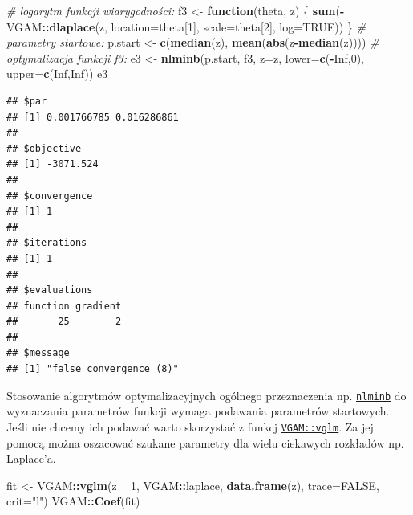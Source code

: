\documentclass[polish,]{book}
\newenvironment{Shaded}{\begin{snugshade}}{\end{snugshade}}
\newcommand{\CommentTok}[1]{\textcolor[rgb]{0.56,0.35,0.01}{\textit{#1}}}
\newcommand{\ControlFlowTok}[1]{\textcolor[rgb]{0.13,0.29,0.53}{\textbf{#1}}}
\newcommand{\DataTypeTok}[1]{\textcolor[rgb]{0.13,0.29,0.53}{#1}}
\newcommand{\DecValTok}[1]{\textcolor[rgb]{0.00,0.00,0.81}{#1}}
\newcommand{\KeywordTok}[1]{\textcolor[rgb]{0.13,0.29,0.53}{\textbf{#1}}}
\newcommand{\NormalTok}[1]{#1}
\newcommand{\OperatorTok}[1]{\textcolor[rgb]{0.81,0.36,0.00}{\textbf{#1}}}
\newcommand{\OtherTok}[1]{\textcolor[rgb]{0.56,0.35,0.01}{#1}}
\newcommand{\StringTok}[1]{\textcolor[rgb]{0.31,0.60,0.02}{#1}}
\begin{document}
\begin{Shaded}
\begin{Highlighting}[]
\CommentTok{# logarytm funkcji wiarygodności:}
\NormalTok{f3 <-}\StringTok{ }\ControlFlowTok{function}\NormalTok{(theta, z) \{}
  \KeywordTok{sum}\NormalTok{(}\OperatorTok{-}\NormalTok{VGAM}\OperatorTok{::}\KeywordTok{dlaplace}\NormalTok{(z, }\DataTypeTok{location=}\NormalTok{theta[}\DecValTok{1}\NormalTok{], }\DataTypeTok{scale=}\NormalTok{theta[}\DecValTok{2}\NormalTok{], }\DataTypeTok{log=}\OtherTok{TRUE}\NormalTok{))}
\NormalTok{  \}}
\CommentTok{# parametry startowe:}
\NormalTok{p.start <-}\StringTok{ }\KeywordTok{c}\NormalTok{(}\KeywordTok{median}\NormalTok{(z), }\KeywordTok{mean}\NormalTok{(}\KeywordTok{abs}\NormalTok{(z}\OperatorTok{-}\KeywordTok{median}\NormalTok{(z))))}
\CommentTok{# optymalizacja funkcji f3:}
\NormalTok{e3 <-}\StringTok{ }\KeywordTok{nlminb}\NormalTok{(p.start, f3, }\DataTypeTok{z=}\NormalTok{z, }\DataTypeTok{lower=}\KeywordTok{c}\NormalTok{(}\OperatorTok{-}\OtherTok{Inf}\NormalTok{,}\DecValTok{0}\NormalTok{), }\DataTypeTok{upper=}\KeywordTok{c}\NormalTok{(}\OtherTok{Inf}\NormalTok{,}\OtherTok{Inf}\NormalTok{))}
\NormalTok{e3}
\end{Highlighting}
\end{Shaded}

\begin{verbatim}
## $par
## [1] 0.001766785 0.016286861
## 
## $objective
## [1] -3071.524
## 
## $convergence
## [1] 1
## 
## $iterations
## [1] 1
## 
## $evaluations
## function gradient 
##       25        2 
## 
## $message
## [1] "false convergence (8)"
\end{verbatim}

Stosowanie algorytmów optymalizacyjnych ogólnego przeznaczenia np. \href{https://rdrr.io/r/stats/nlminb.html}{\texttt{nlminb}} do wyznaczania parametrów funkcji
wymaga podawania parametrów startowych. Jeśli nie chcemy ich podawać
warto skorzystać z funkcj \href{https://rdrr.io/cran/VGAM/man/vglm.html}{\texttt{VGAM::vglm}}.
Za jej pomocą można oszacować szukane parametry dla wielu ciekawych rozkładów np. Laplace'a.

\begin{Shaded}
\begin{Highlighting}[]
\NormalTok{fit <-}\StringTok{ }\NormalTok{VGAM}\OperatorTok{::}\KeywordTok{vglm}\NormalTok{(z }\OperatorTok{~}\StringTok{ }\DecValTok{1}\NormalTok{, VGAM}\OperatorTok{::}\NormalTok{laplace, }\KeywordTok{data.frame}\NormalTok{(z), }\DataTypeTok{trace=}\OtherTok{FALSE}\NormalTok{, }\DataTypeTok{crit=}\StringTok{"l"}\NormalTok{)}
\NormalTok{VGAM}\OperatorTok{::}\KeywordTok{Coef}\NormalTok{(fit)}
\end{Highlighting}
\end{Shaded}
\end{document}
